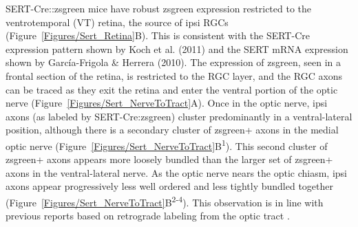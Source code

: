 SERT-Cre::zsgreen mice have robust zsgreen expression restricted to the ventrotemporal (VT) retina, the source of ipsi RGCs (Figure~\ref{Figures/Sert_Retina}B).
This is consistent with the SERT-Cre expression pattern shown by Koch et al. (2011) and the SERT mRNA expression shown by Garc\'ia-Frigola \& Herrera (2010). 
The expression of zsgreen, seen in a frontal section of the retina, is restricted to the RGC layer, and the RGC axons can be traced as they exit the retina and enter the ventral portion of the optic nerve (Figure~\ref{Figures/Sert_NerveToTract}A).
Once in the optic nerve, ipsi axons (as labeled by SERT-Cre:zsgreen) cluster predominantly in a ventral-lateral position, although there is a secondary cluster of zsgreen+ axons in the medial optic nerve (Figure~\ref{Figures/Sert_NerveToTract}B\textsuperscript{1}).
This second cluster of zsgreen+ axons appears more loosely bundled than the larger set of zsgreen+ axons in the ventral-lateral nerve.
As the optic nerve nears the optic chiasm, ipsi axons appear progressively less well ordered and less tightly bundled together (Figure~\ref{Figures/Sert_NerveToTract}B\textsuperscript{2-4}).
This observation is in line with previous reports based on retrograde labeling from the optic tract \cite{colello1990early}.

